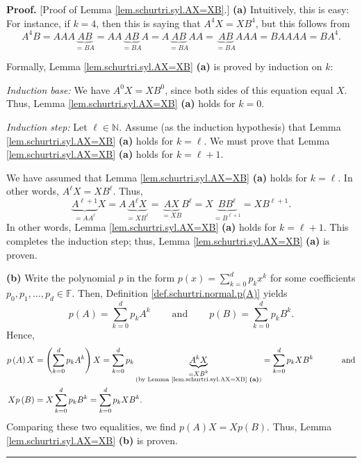 \documentclass[numbers=enddot,12pt,final,onecolumn,notitlepage]{scrartcl}%
\numberwithin{exer}{subsection}
\theoremstyle{definition}
\newenvironment{proof}[1][Proof]{\noindent\textbf{#1.} }{\ \rule{0.5em}{0.5em}}
\let\sumnonlimits\sum
\renewcommand{\sum}{\sumnonlimits\limits}
\begin{document}
\begin{proof}
[Proof of Lemma \ref{lem.schurtri.syl.AX=XB}.] \textbf{(a)} Intuitively, this
is easy: For instance, if $k=4$, then this is saying that $A^{4}X=XB^{4}$, but
this follows from
\[
A^{4}B=AAA\underbrace{AB}_{=BA}=AA\underbrace{AB}_{=BA}A=A\underbrace{AB}%
_{=BA}AA=\underbrace{AB}_{=BA}AAA=BAAAA=BA^{4}.
\]


Formally, Lemma \ref{lem.schurtri.syl.AX=XB} \textbf{(a)} is proved by
induction on $k$:

\textit{Induction base:} We have $A^{0}X=XB^{0}$, since both sides of this
equation equal $X$. Thus, Lemma \ref{lem.schurtri.syl.AX=XB} \textbf{(a)}
holds for $k=0$.

\textit{Induction step:} Let $\ell\in\mathbb{N}$. Assume (as the induction
hypothesis) that Lemma \ref{lem.schurtri.syl.AX=XB} \textbf{(a)} holds for
$k=\ell$. We must prove that Lemma \ref{lem.schurtri.syl.AX=XB} \textbf{(a)}
holds for $k=\ell+1$.

We have assumed that Lemma \ref{lem.schurtri.syl.AX=XB} \textbf{(a)} holds for
$k=\ell$. In other words, $A^{\ell}X=XB^{\ell}$. Thus,%
\[
\underbrace{A^{\ell+1}}_{=AA^{\ell}}X=A\underbrace{A^{\ell}X}_{=XB^{\ell}%
}=\underbrace{AX}_{=XB}B^{\ell}=X\underbrace{BB^{\ell}}_{=B^{\ell+1}}%
=XB^{\ell+1}.
\]
In other words, Lemma \ref{lem.schurtri.syl.AX=XB} \textbf{(a)} holds for
$k=\ell+1$. This completes the induction step; thus, Lemma
\ref{lem.schurtri.syl.AX=XB} \textbf{(a)} is proven. \medskip

\textbf{(b)} Write the polynomial $p$ in the form $p\left(  x\right)
=\sum_{k=0}^{d}p_{k}x^{k}$ for some coefficients $p_{0},p_{1},\ldots,p_{d}%
\in\mathbb{F}$. Then, Definition \ref{def.schurtri.normal.p(A)} yields%
\[
p\left(  A\right)  =\sum_{k=0}^{d}p_{k}A^{k}\ \ \ \ \ \ \ \ \ \ \text{and}%
\ \ \ \ \ \ \ \ \ \ p\left(  B\right)  =\sum_{k=0}^{d}p_{k}B^{k}.
\]
Hence,%
\begin{align*}
p\left(  A\right)  X  & =\left(  \sum_{k=0}^{d}p_{k}A^{k}\right)  X=\sum
_{k=0}^{d}p_{k}\underbrace{A^{k}X}_{\substack{=XB^{k}\\\text{(by Lemma
\ref{lem.schurtri.syl.AX=XB} \textbf{(a)})}}}=\sum_{k=0}^{d}p_{k}%
XB^{k}\ \ \ \ \ \ \ \ \ \ \text{and}\\
Xp\left(  B\right)    & =X\sum_{k=0}^{d}p_{k}B^{k}=\sum_{k=0}^{d}p_{k}XB^{k}.
\end{align*}
Comparing these two equalities, we find $p\left(  A\right)  X=Xp\left(
B\right)  $. Thus, Lemma \ref{lem.schurtri.syl.AX=XB} \textbf{(b)} is proven.
\end{proof}
\end{document}
